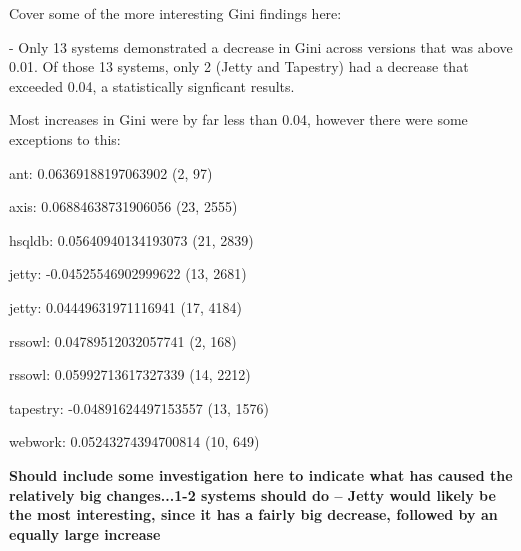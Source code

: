 \crumbs
{
Cover some of the more interesting Gini findings here:

- Only 13 systems demonstrated a decrease in Gini across versions that was above 0.01. Of those 13 systems, only 2 (Jetty and Tapestry) had a decrease that exceeded 0.04, a statistically signficant results.

Most increases in Gini were by far less than 0.04, however there were some exceptions to this:

ant: 0.06369188197063902 (2, 97)

axis: 0.06884638731906056 (23, 2555)

hsqldb: 0.05640940134193073 (21, 2839)

jetty: -0.04525546902999622 (13, 2681)

jetty: 0.04449631971116941 (17, 4184)

rssowl: 0.04789512032057741 (2, 168)

rssowl: 0.05992713617327339 (14, 2212)

tapestry: -0.04891624497153557 (13, 1576)

webwork: 0.05243274394700814 (10, 649)

\textbf{Should include some investigation here to indicate what has caused the relatively big changes...1-2 systems should do -- Jetty would likely be the most interesting, since it has a fairly big decrease, followed by an equally large increase}

}



